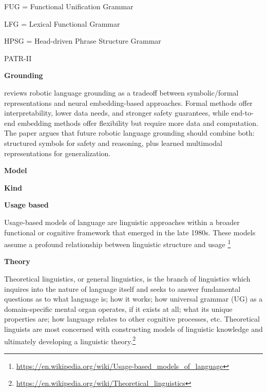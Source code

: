 \documentclass{book}
\providecommand{\ProjectDeepHeading}[2]{%
    \par\medskip\noindent\textbf{#2}\par\smallskip
}
\providecommand{\seeherefooter}[1]{\footnote{\url{#1}}}
\begin{document}
FUG  = Functional Unification Grammar
    
    LFG  = Lexical Functional Grammar
    
    HPSG = Head-driven Phrase Structure Grammar
    
    PATR-II

\ProjectDeepHeading{5}{Grounding}


\cite{cohen-2024-a-survey-of-robotic-language-grounding-tradeoffs-between-symbols-and-embeddings} reviews robotic language grounding as a tradeoff between symbolic/formal representations and neural embedding-based approaches. Formal methods offer interpretability, lower data needs, and stronger safety guarantees, while end-to-end embedding methods offer flexibility but require more data and computation. The paper argues that future robotic language grounding should combine both: structured symbols for safety and reasoning, plus learned multimodal representations for generalization.

\ProjectDeepHeading{5}{Model}

\ProjectDeepHeading{6}{Kind}

\ProjectDeepHeading{7}{Usage based}


Usage-based models of language are linguistic approaches within a broader functional or cognitive framework that emerged in the late 1980s. These models assume a profound relationship between linguistic structure and usage \seeherefooter{https://en.wikipedia.org/wiki/Usage-based_models_of_language}

\ProjectDeepHeading{5}{Theory}


Theoretical linguistics, or general linguistics, is the branch of linguistics which inquires into the nature of language itself and seeks to answer fundamental questions as to what language is; how it works; how universal grammar (UG) as a domain-specific mental organ operates, if it exists at all; what its unique properties are; how language relates to other cognitive processes, etc. Theoretical linguists are most concerned with constructing models of linguistic knowledge and ultimately developing a linguistic theory.\seeherefooter{https://en.wikipedia.org/wiki/Theoretical_linguistics}
\end{document}
